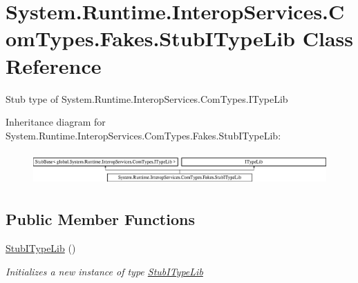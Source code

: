 \hypertarget{class_system_1_1_runtime_1_1_interop_services_1_1_com_types_1_1_fakes_1_1_stub_i_type_lib}{\section{System.\-Runtime.\-Interop\-Services.\-Com\-Types.\-Fakes.\-Stub\-I\-Type\-Lib Class Reference}
\label{class_system_1_1_runtime_1_1_interop_services_1_1_com_types_1_1_fakes_1_1_stub_i_type_lib}
}


Stub type of System.\-Runtime.\-Interop\-Services.\-Com\-Types.\-I\-Type\-Lib 


Inheritance diagram for System.\-Runtime.\-Interop\-Services.\-Com\-Types.\-Fakes.\-Stub\-I\-Type\-Lib\-:\begin{figure}[H]
\begin{center}
\leavevmode
\includegraphics[height=1.299304cm]{class_system_1_1_runtime_1_1_interop_services_1_1_com_types_1_1_fakes_1_1_stub_i_type_lib}
\end{center}
\end{figure}
\subsection*{Public Member Functions}
\begin{DoxyCompactItemize}
\item 
\hyperlink{class_system_1_1_runtime_1_1_interop_services_1_1_com_types_1_1_fakes_1_1_stub_i_type_lib_a173740e81f508761683cc397fe922d30}{Stub\-I\-Type\-Lib} ()
\begin{DoxyCompactList}\small\item\em Initializes a new instance of type \hyperlink{class_system_1_1_runtime_1_1_interop_services_1_1_com_types_1_1_fakes_1_1_stub_i_type_lib}{Stub\-I\-Type\-Lib}\end{DoxyCompactList}\end{DoxyCompactItemize}
